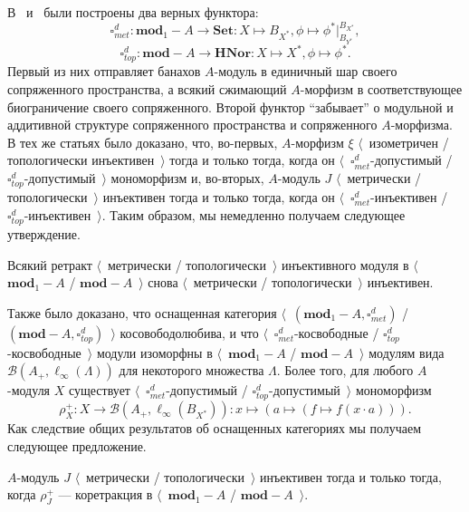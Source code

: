 В~\cite{HelMetrFrQMod} и~\cite{ShtTopFrClassicQuantMod} были построены два
верных функтора:
$$
\square_{met}^d:\mathbf{mod}_1-A\to\mathbf{Set}
:X\mapsto B_{X^*},\phi\mapsto\phi^*|_{B_{Y^*}}^{B_{X^*}},
$$
$$
\square_{top}^d:\mathbf{mod}-A\to\mathbf{HNor}:X\mapsto X^*,\phi\mapsto\phi^*.
$$
Первый из них отправляет банахов $A$-модуль в единичный шар своего сопряженного
пространства, а всякий сжимающий $A$-морфизм в соответствующее биограничение
своего сопряженного. Второй функтор ``забывает'' о модульной и аддитивной
структуре сопряженного пространства и сопряженного $A$-морфизма. В тех же
статьях было доказано, что, во-первых, $A$-морфизм $\xi$ $\langle$~изометричен /
топологически инъективен~$\rangle$ тогда и только тогда, когда он
$\langle$~$\square_{met}^d$-допустимый / $\square_{top}^d$-допустимый~$\rangle$
мономорфизм и, во-вторых, $A$-модуль $J$ $\langle$~метрически /
топологически~$\rangle$ инъективен тогда и только тогда, когда он
$\langle$~$\square_{met}^d$-инъективен / $\square_{top}^d$-инъективен~$\rangle$.
Таким образом, мы немедленно получаем следующее утверждение.

\begin{proposition}\label{RetrMetTopInjIsMetTopInj} Всякий ретракт
$\langle$~метрически / топологически~$\rangle$ инъективного модуля в
$\langle$~$\mathbf{mod}_1-A$ / $\mathbf{mod}-A$~$\rangle$ снова
$\langle$~метрически / топологически~$\rangle$ инъективен.
\end{proposition}

Также было доказано, что оснащенная категория
$\langle$~$(\mathbf{mod}_1-A,\square_{met}^d)$ /
$(\mathbf{mod}-A,\square_{top}^d)$~$\rangle$ косовободолюбива, и что
$\langle$~$\square_{met}^d$-косвободные /
$\square_{top}^d$-косвободные~$\rangle$ модули изоморфны в
$\langle$~$\mathbf{mod}_1-A$ / $\mathbf{mod}-A$~$\rangle$ модулям вида
$\mathcal{B}(A_+, \ell_\infty(\Lambda))$ для некоторого множества $\Lambda$.
Более того, для любого $A$-модуля $X$ существует
$\langle$~$\square_{met}^d$-допустимый / $\square_{top}^d$-допустимый~$\rangle$
мономорфизм
$$
\rho_X^+:X\to\mathcal{B}(A_+,\ell_\infty(B_{X^*}))
:x\mapsto(a\mapsto(f\mapsto f(x\cdot a))).
$$
Как следствие общих результатов об оснащенных категориях мы получаем следующее
предложение.

\begin{proposition}\label{MetTopInjModViaCanonicMorph} $A$-модуль $J$
$\langle$~метрически / топологически~$\rangle$ инъективен тогда и только тогда,
когда $\rho_J^+$ --- коретракция в $\langle$~$\mathbf{mod}_1-A$ /
$\mathbf{mod}-A$~$\rangle$.
\end{proposition}

